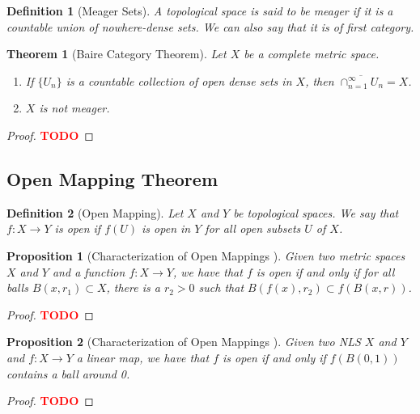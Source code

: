 \documentclass{article}
\newtheorem*{theorem}{Theorem}
\newtheorem*{proposition}{Proposition}
\newtheorem*{definition}{Definition}
\newcommand{\td}{\textcolor{red}{\textbf{TODO}}}
\begin{document}
\begin{definition}[Meager Sets]
    A topological space is said to be meager if it is a countable union of nowhere-dense sets. We can also say that it is of first category.
\end{definition}

\begin{theorem}[Baire Category Theorem]
    Let $X$ be a complete metric space.
    \begin{enumerate}[label=(\alph*)]
        \item If $\{U_n\}$ is a countable collection of open dense sets in $X$, then $\overline{\cap_{n=1}^{\infty}U_n} = X$.
        \item $X$ is not meager.
    \end{enumerate}
\end{theorem}

\begin{proof}
    \td 
\end{proof}

\subsection{Open Mapping Theorem}

\begin{definition}[Open Mapping]
    Let $X$ and $Y$ be topological spaces. We say that $f : X \to Y$ is open if $f(U)$ is open in $Y$ for all open subsets $U$ of $X$.
\end{definition}

\begin{proposition}[Characterization of Open Mappings \MakeUppercase{}]
    Given two metric spaces $X$ and $Y$ and a function $f : X \to Y$, we have that $f$ is open if and only if for all balls $B(x, r_1) \subset X$, there is a $r_2 > 0$ such that $B(f(x), r_2) \subset f(B(x,r))$.
\end{proposition}

\begin{proof}
    \td 
\end{proof}

\begin{proposition}[Characterization of Open Mappings \MakeUppercase{}]
    Given two NLS $X$ and $Y$ and $f : X \to Y$ a linear map, we have that $f$ is open if and only if $f(B(0,1))$ contains a ball around 0.
\end{proposition}

\begin{proof}
    \td 
\end{proof}
\end{document}
